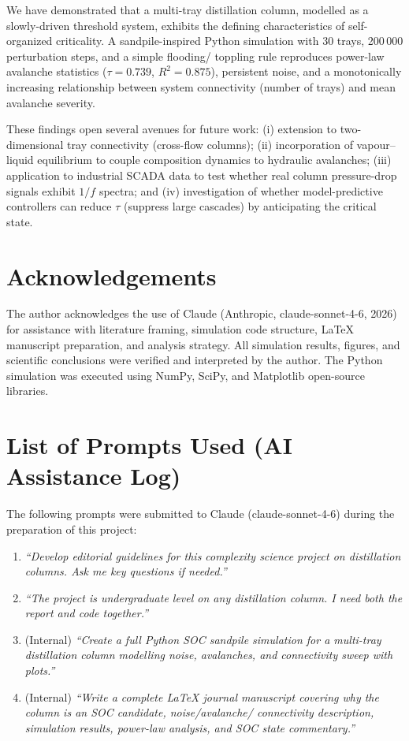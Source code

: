 \documentclass[twocolumn,12pt]{article}
\begin{document}
We have demonstrated that a multi-tray distillation column, modelled as
a slowly-driven threshold system, exhibits the defining characteristics
of self-organized criticality.  A sandpile-inspired Python simulation
with 30 trays, 200\,000 perturbation steps, and a simple flooding/
toppling rule reproduces power-law avalanche statistics
($\tau = 0.739$, $R^2 = 0.875$), persistent noise, and a monotonically
increasing relationship between system connectivity (number of trays)
and mean avalanche severity.

These findings open several avenues for future work: (i) extension to
two-dimensional tray connectivity (cross-flow columns); (ii) incorporation
of vapour--liquid equilibrium to couple composition dynamics to hydraulic
avalanches; (iii) application to industrial SCADA data to test whether
real column pressure-drop signals exhibit $1/f$ spectra; and (iv)
investigation of whether model-predictive controllers can reduce $\tau$
(suppress large cascades) by anticipating the critical state.

\section*{Acknowledgements}

The author acknowledges the use of Claude (Anthropic, claude-sonnet-4-6,
2026) for assistance with literature framing, simulation code structure,
LaTeX manuscript preparation, and analysis strategy.  All simulation
results, figures, and scientific conclusions were verified and interpreted
by the author.  The Python simulation was executed using NumPy, SciPy, and
Matplotlib open-source libraries.

\section*{List of Prompts Used (AI Assistance Log)}

The following prompts were submitted to Claude (claude-sonnet-4-6) during
the preparation of this project:

\begin{enumerate}
  \item \textit{``Develop editorial guidelines for this complexity science
        project on distillation columns. Ask me key questions if needed.''}
  \item \textit{``The project is undergraduate level on any distillation
        column. I need both the report and code together.''}
  \item (Internal) \textit{``Create a full Python SOC sandpile simulation
        for a multi-tray distillation column modelling noise, avalanches,
        and connectivity sweep with plots.''}
  \item (Internal) \textit{``Write a complete LaTeX journal manuscript
        covering why the column is an SOC candidate, noise/avalanche/
        connectivity description, simulation results, power-law analysis,
        and SOC state commentary.''}
\end{enumerate}
\end{document}
